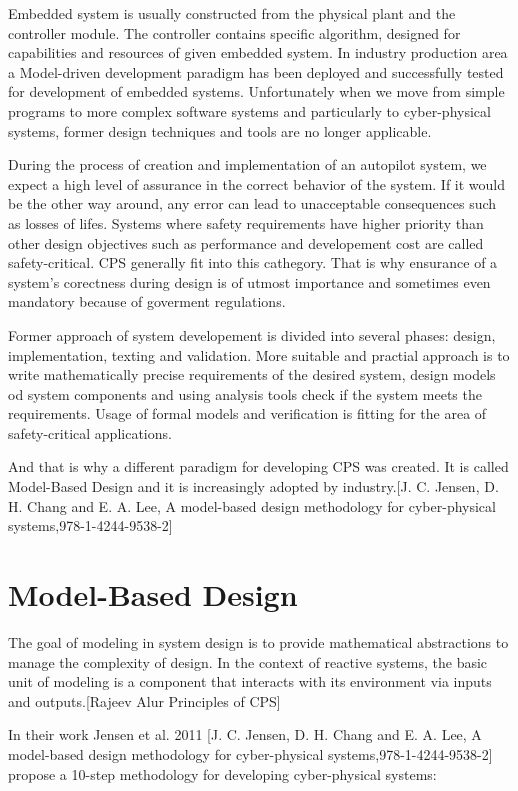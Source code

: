 Embedded system is usually constructed from the physical plant and the controller module. The controller contains specific algorithm, designed for capabilities and resources of given embedded system. In industry production area a Model-driven development paradigm has been deployed and successfully tested for development of embedded systems. Unfortunately when we move from simple programs to more complex software systems and particularly to cyber-physical systems, former design techniques and tools are no longer applicable.

During the process of creation and implementation of an autopilot system, we expect a high level of assurance in the correct behavior of the system. If it would be the other way around, any error can lead to unacceptable consequences such as losses of lifes. Systems where safety requirements have higher priority than other design objectives such as performance and developement cost are called safety-critical. CPS generally fit into this cathegory. That is why ensurance of a system's corectness during design is of utmost importance and sometimes even mandatory because of goverment regulations.


Former approach of system developement is divided into several phases: design, implementation, texting and validation. More suitable and practial approach is to write mathematically precise requirements of the desired system, design models od system components and using analysis tools check if the system meets the requirements. Usage of formal models and verification is fitting for the area of safety-critical applications. 

And that is why a different paradigm for developing CPS was created. It is called Model-Based Design and it is increasingly adopted by industry.[J. C. Jensen, D. H. Chang and E. A. Lee, A model-based design methodology for cyber-physical systems,978-1-4244-9538-2]

\section{Model-Based Design}

The goal of modeling in system design is to provide mathematical abstractions to manage the complexity of design. In the context of reactive systems, the basic unit of modeling is a component that interacts with its environment via inputs and outputs.[Rajeev Alur Principles of CPS]



In their work Jensen et al. 2011  [J. C. Jensen, D. H. Chang and E. A. Lee, A model-based design methodology for cyber-physical systems,978-1-4244-9538-2] propose a 10-step methodology for developing cyber-physical systems:

